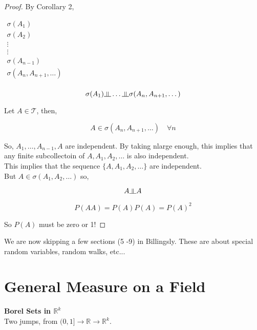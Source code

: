 \documentclass[11pt,fleqn]{book} %
\newcommand{\indep}{\rotatebox[origin=c]{90}{$\models$}}
\begin{document}
\begin{proof}
	By Corollary 2, 

	$\begin{matrix}
		\sigma(A_1)\\
		\sigma(A_2)\\
		\vdots\\
		\vdots\\
		\sigma(A_{n-1})\\
		\sigma(A_n, A_{n+1}, \dots)\\
	\end{matrix}$

	$$\sigma(A_1) \indep \dots \indep \sigma(A_n, A_{n+1}, \dots)$$

	Let $A \in \mathscr{T}$, then,

	$$A \in \sigma(A_n, A_{n+1}, \dots) \quad \forall n$$

	So, $A_1, \dots, A_{n-1}, A$ are independent. By taking nlarge enough, this implies that any  finite subcollectoin of $A, A_1, A_2, \dots$ is also independent. \\

	This implies that the sequence $\{ A, A_1, A_2, \dots\}$ are independent. \\

	But $A \in \sigma(A_1, A_2, \dots)$ so, 

	$$A \indep A$$

	$$ P(AA) = P(A)P(A) = P(A)^2 $$

	So $P(A)$ must be zero or 1! 

\end{proof}

\begin{remark}
	We are now skipping a few sections (5 -9) in Billingsly. These are about special random variables, random walks, etc...
\end{remark}





\section{General Measure on a Field}





\textbf{Borel Sets in $\mathbb{R}^k$}\\

Two jumps, from $(0,1] \rightarrow \mathbb{R} \rightarrow \mathbb{R}^k$.
\end{document}
